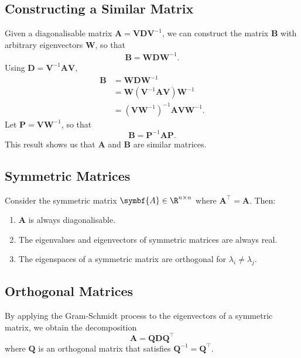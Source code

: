 \documentclass{article}
\begin{document}
\subsection{Constructing a Similar Matrix}
Given a diagonalisable matrix \(\symbf{A} = \symbf{V}\symbf{D}\symbf{V}^{-1}\), we can construct the matrix \(\symbf{B}\) with arbitrary eigenvectors
\(\symbf{W}\), so that
\begin{align*}
    \symbf{B} = \symbf{W} \symbf{D} \symbf{W}^{-1}.
\end{align*}
Using \(\symbf{D} = \symbf{V}^{-1} \symbf{A} \symbf{V}\),
\begin{align*}
    \symbf{B} & = \symbf{W} \symbf{D} \symbf{W}^{-1}                                               \\
              & = \symbf{W} \left( \symbf{V}^{-1} \symbf{A} \symbf{V} \right) \symbf{W}^{-1}       \\
              & = \left( \symbf{V} \symbf{W}^{-1} \right)^{-1} \symbf{A} \symbf{V} \symbf{W}^{-1}.
\end{align*}
Let \(\symbf{P} = \symbf{V} \symbf{W}^{-1}\), so that
\begin{equation*}
    \symbf{B} = \symbf{P}^{-1} \symbf{A} \symbf{P}.
\end{equation*}
This result shows us that \(\symbf{A}\) and \(\symbf{B}\) are similar matrices.
\subsection{Symmetric Matrices}
Consider the symmetric matrix \(\symbf{A}\in\R^{n \times n}\) where \(\symbf{A}^\top = \symbf{A}\).
Then:
\begin{enumerate}
    \item \(\symbf{A}\) is always diagonalisable.
    \item The eigenvalues and eigenvectors of symmetric matrices are always real.
    \item The eigenspaces of a symmetric matrix are orthogonal for \(\lambda_i \neq \lambda_j\).
\end{enumerate}
\subsection{Orthogonal Matrices}
By applying the Gram-Schmidt process to the eigenvectors of a symmetric matrix, we obtain the decomposition
\begin{equation*}
    \symbf{A} = \symbf{Q} \symbf{D} \symbf{Q}^\top
\end{equation*}
where \(\symbf{Q}\) is an orthogonal matrix that satisfies \(\symbf{Q}^{-1} = \symbf{Q}^\top\).
\end{document}
